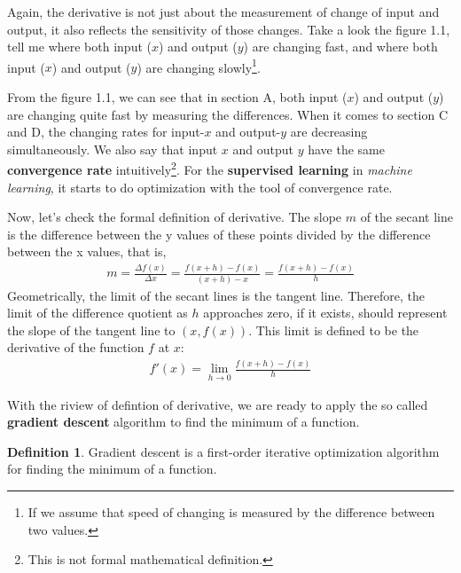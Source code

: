 \documentclass[12pt]{article}
\theoremstyle{definition}
\newtheorem{definition}[subsection]{Definition}
\numberwithin{equation}{section}
\numberwithin{figure}{section}
\numberwithin{table}{section}
\begin{document}
Again, the derivative is not just about the measurement of change of input and output, it also reflects the sensitivity of those changes. Take a look the figure 1.1, tell me where both input ($x$) and output ($y$) are changing fast, and where both input ($x$) and output ($y$) are changing slowly\footnote{If we assume that speed of changing is measured by the difference between two values.}.

From the figure 1.1, we can see that in section A, both input ($x$) and output ($y$) are changing quite fast by measuring the differences. When it comes to section C and D, the changing rates for input-$x$ and output-$y$ are decreasing simultaneously. We also say that input $x$ and output $y$ have the same \textbf{convergence rate} intuitively\footnote{This is not formal mathematical definition.}. For the \textbf{supervised learning} in \textit{machine learning}, it starts to do optimization with the tool of convergence rate.

Now, let's check the formal definition of derivative. The slope $m$ of the secant line is the difference between the y values of these points divided by the difference between the x values, that is,
\begin{align*}
  m = \frac{\Delta f(x)}{\Delta x} = \frac{f(x+h) - f(x)}{(x+h) -x} = \frac{f(x+h)-f(x)}{h}
\end{align*}
Geometrically, the limit of the secant lines is the tangent line. Therefore, the limit of the difference quotient as $h$ approaches zero, if it exists, should represent the slope of the tangent line to $(x, f(x))$. This limit is defined to be the derivative of the function $f$ at $x$:
\begin{align*}
  f'(x) = \lim_{h\to 0} \frac{f(x+h) - f(x)}{h}
\end{align*}

With the riview of defintion of derivative, we are ready to apply the so called \textbf{gradient descent} algorithm to find the minimum of a function.
\begin{definition}
  Gradient descent is a first-order iterative optimization algorithm for finding the minimum of a function.
\end{definition}
\end{document}
